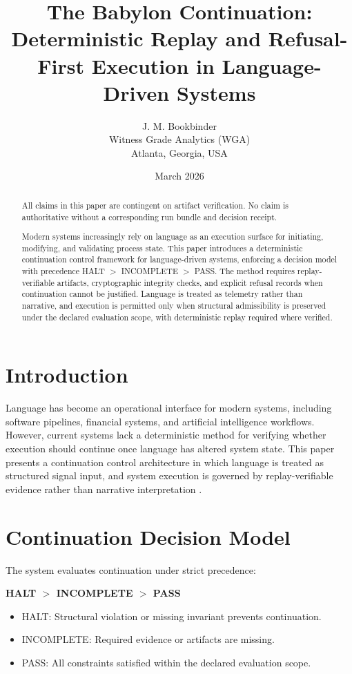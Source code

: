 \documentclass[11pt]{article}
\title{The Babylon Continuation: Deterministic Replay and Refusal-First Execution in Language-Driven Systems}
\author{J. M. Bookbinder\\Witness Grade Analytics (WGA)\\Atlanta, Georgia, USA}
\date{March 2026}
\begin{document}
\maketitle

\begin{abstract}
All claims in this paper are contingent on artifact verification. No claim is authoritative without a corresponding run bundle and decision receipt.

Modern systems increasingly rely on language as an execution surface for initiating, modifying, and validating process state. This paper introduces a deterministic continuation control framework for language-driven systems, enforcing a decision model with precedence HALT $>$ INCOMPLETE $>$ PASS. The method requires replay-verifiable artifacts, cryptographic integrity checks, and explicit refusal records when continuation cannot be justified. Language is treated as telemetry rather than narrative, and execution is permitted only when structural admissibility is preserved under the declared evaluation scope, with deterministic replay required where verified.
\end{abstract}

\section{Introduction}

Language has become an operational interface for modern systems, including software pipelines, financial systems, and artificial intelligence workflows. However, current systems lack a deterministic method for verifying whether execution should continue once language has altered system state. This paper presents a continuation control architecture in which language is treated as structured signal input, and system execution is governed by replay-verifiable evidence rather than narrative interpretation \cite{bookbinder2026babylon}.

\section{Continuation Decision Model}

The system evaluates continuation under strict precedence:

\begin{center}
\textbf{HALT $>$ INCOMPLETE $>$ PASS}
\end{center}

\begin{itemize}
    \item HALT: Structural violation or missing invariant prevents continuation.
    \item INCOMPLETE: Required evidence or artifacts are missing.
    \item PASS: All constraints satisfied within the declared evaluation scope.
\end{itemize}
\end{document}
